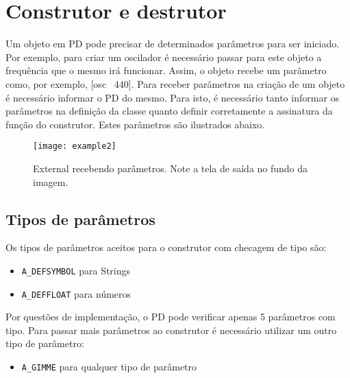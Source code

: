 \chapter{Construtor e destrutor}

Um objeto em PD pode precisar de determinados parâmetros para ser iniciado.
Por exemplo, para criar um oscilador é necessário passar para este objeto a
frequência que o mesmo irá funcionar.
Assim, o objeto recebe um parâmetro como, por exemplo, [osc~ 440].
Para receber parâmetros na criação de um objeto é necessário informar o PD do mesmo.
Para isto, é necessário tanto informar os parâmetros na definição da classe quanto
definir corretamente a assinatura da função do construtor.
Estes parâmetros são ilustrados abaixo.

\begin{figure}[h!]
	\centering
	\texttt{[image: example2]}
	\caption{External recebendo parâmetros. Note a tela de saída no fundo da imagem.}
\end{figure}


\section{Tipos de parâmetros}

Os tipos de parâmetros aceitos para o construtor com checagem de tipo são:
\begin{itemize}
   \item \texttt{A\_DEFSYMBOL} para Strings
   \item \texttt{A\_DEFFLOAT} para números
\end{itemize}

Por questões de implementação, o PD pode verificar apenas 5 parâmetros com tipo.
Para passar mais parâmetros ao construtor é necessário utilizar um outro tipo
de parâmetro:

\begin{itemize}
   \item \texttt{A\_GIMME} para qualquer tipo de parâmetro
\end{itemize}

